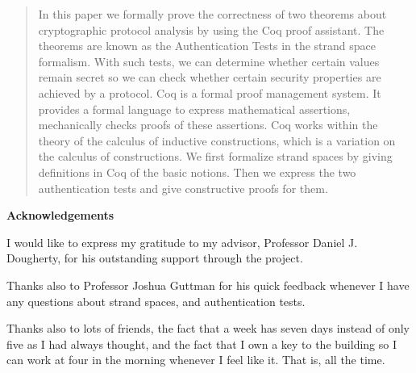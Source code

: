 \documentclass[12pt]{report}
\begin{document}

\newpage


\begin{abstract}
In this paper we formally prove the correctness of two theorems about
cryptographic protocol analysis by using the Coq proof assistant.  The
theorems are known as the Authentication Tests in the strand space
formalism.  With such tests, we can determine whether certain values
remain secret so we can check whether certain security properties are
achieved by a protocol.  Coq is a formal proof management system. It
provides a formal language to express mathematical assertions,
mechanically checks proofs of these assertions.  Coq works within the
theory of the calculus of inductive constructions, which is a
variation on the calculus of constructions. We first formalize strand
spaces by giving definitions in Coq of the basic notions. Then we
express the two authentication tests and give constructive proofs for
them.
\end{abstract}


%
\begin{center}
	\textbf{Acknowledgements}
\end{center}

	I would like to express my gratitude to my advisor, Professor Daniel J. 	     	Dougherty, for his outstanding support through the project. 
	
	Thanks also to Professor Joshua Guttman for his quick feedback whenever 
	I have any questions about strand spaces, and authentication tests.  

	Thanks also to lots of friends, the fact that a week has
	seven days instead of only five as I had always thought, and
	the fact that I own a key to the building so I can work at four
	in the morning whenever I feel like it. That is, all the time.

\clearpage
\tableofcontents

\listoffigures
\listoftables

\clearpage

\setcounter{page}{1}








\end{document}
